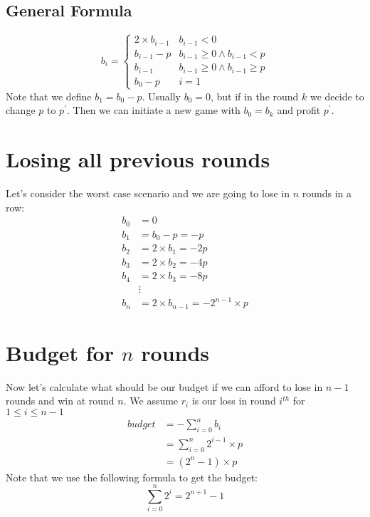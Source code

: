 \documentclass{book}
\begin{document}
	\subsection{General Formula}
	\begin{equation*}
		b_i = \begin{cases}
			2 \times b_{i - 1} & b_{i - 1} < 0 \\
			b_{i - 1} - p & b_{i - 1} \ge 0 \land b_{i - 1} < p \\
			b_{i - 1} & b_{i - 1} \ge 0 \land b_{i - 1} \ge p \\
			b_0 -p & i = 1
		\end{cases}	
	\end{equation*}
	Note that we define $b_1 = b_0 - p$. Usually $b_0 = 0$, but if in the round $k$ we decide to change $p$ to $p^{\prime}$. Then we can initiate a new game with $b_0 = b_k$ and profit $p^\prime$.  
	\section{Losing all previous rounds}
	Let's consider the worst case scenario and we are going to lose in $n$ rounds in a row:
	\begin{equation*}
		\begin{split}
			b_0 &= 0 \\
			b_1 &= b_0 - p = -p \\
			b_2 &= 2 \times b_1 = -2p \\
			b_3 &= 2 \times b_2 = -4p \\
			b_4 &= 2 \times b_3 = -8p \\
			&\vdots \\
			b_{n} &= 2 \times b_{n - 1} = -2^{n - 1} \times p
	     \end{split}
	\end{equation*}
	\section{Budget for $n$ rounds}
	Now let's calculate what should be our budget if we can afford to lose in ${n -1}$ rounds and win at round $n$. We assume $r_i$ is our loss in round $i^{th}$ for $1 \le i \le n - 1$
	\begin{equation*}
		\begin{split}
			budget &= -\sum_{i = 0}^{n}{b_i} \\
			&= \sum_{i = 0}^{n}{2^{i - 1} \times p} \\
			&= (2^n - 1) \times p
		\end{split}
	\end{equation*}
	Note that we use the following formula to get the budget:
	\begin{equation*}
		\sum_{i = 0}^{n}{2^i} = 2^{n + 1} - 1
	\end{equation*}
\end{document}
